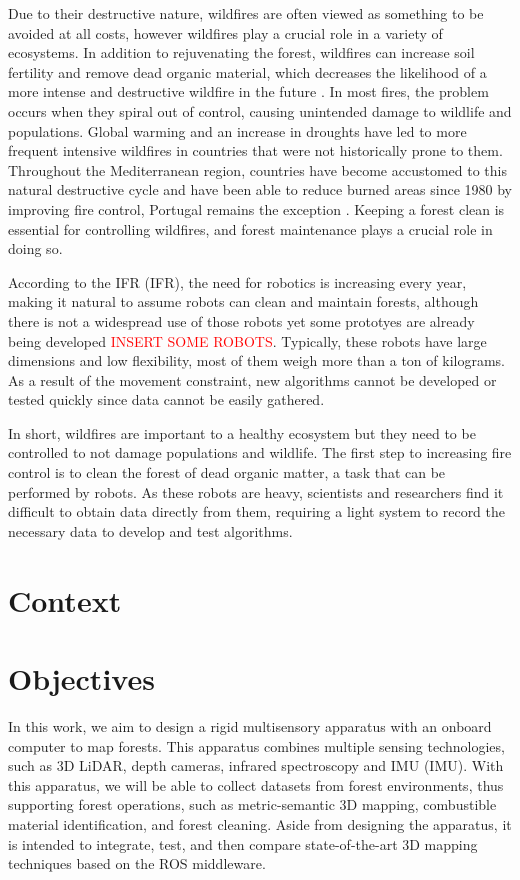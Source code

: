 Due to their destructive nature, wildfires are often viewed as something to be avoided at all costs, however wildfires play a crucial role in a variety of ecosystems. In addition to rejuvenating the forest, wildfires can increase soil fertility and remove dead organic material, which decreases the likelihood of a more intense and destructive wildfire in the future \cite{bond_fires_2017}. In most fires, the problem occurs when they spiral out of control, causing unintended damage to wildlife and populations. Global warming and an increase in droughts have led to more frequent intensive wildfires in countries that were not historically prone to them. Throughout the Mediterranean region, countries have become accustomed to this natural destructive cycle and have been able to reduce burned areas since 1980 by improving fire control, Portugal remains the exception \cite{turco_decreasing_2016}\cite{european_commission_joint_research_centre_forest_2021}. Keeping a forest clean is essential for controlling wildfires, and forest maintenance plays a crucial role in doing so.

According to the \acl{IFR} (\acs{IFR}), the need for robotics is increasing every year, making it natural to assume robots can clean and maintain forests, although there is not a widespread use of those robots yet some prototyes are already being developed \textcolor{red}{INSERT SOME ROBOTS}. Typically, these robots have large dimensions and low flexibility, most of them weigh more than a ton of kilograms. As a result of the movement constraint, new algorithms cannot be developed or tested quickly since data cannot be easily gathered.

In short, wildfires are important to a healthy ecosystem but they need to be controlled to not damage populations and wildlife. The first step to increasing fire control is to clean the forest of dead organic matter, a task that can be performed by robots. As these robots are heavy, scientists and researchers find it difficult to obtain data directly from them, requiring a light system to record the necessary data to develop and test algorithms.

\section{Context}

\section{Objectives}
In this work, we aim to design a rigid multisensory apparatus with an onboard computer to map forests. This apparatus combines multiple sensing technologies, such as 3D \acs{LiDAR}, depth cameras, infrared spectroscopy and \acl{IMU} (\acs{IMU}). With this apparatus, we will be able to collect datasets from forest environments, thus supporting forest operations, such as metric-semantic 3D mapping, combustible material identification, and forest cleaning. Aside from designing the apparatus, it is intended to integrate, test, and then compare state-of-the-art 3D mapping techniques based on the ROS middleware.

